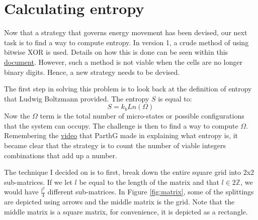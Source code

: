\section{Calculating entropy}
Now that a strategy that governs energy movement has been devised, our next task is to find a way to compute entropy. In version 1, a crude method of using bitwise XOR is used. Details on how this is done can be seen within this \href{https://github.com/ShiroHusin/Entropy_Simulation/blob/main/Entropy_Computation.pdf}{document}. However, such a method is not viable when the cells are no longer binary digits. Hence, a new strategy needs to be devised. \par

\vspace{0.3cm}
\noindent
The first step in solving this problem is to look back at the definition of entropy that Ludwig Boltzmann provided. The entropy $S$ is equal to: 
\begin{equation}
    S=k_{b}Ln(\Omega)
    \label{entropy_eq}
\end{equation}
Now the $\Omega$ term is the total number of micro-states or possible configurations that the system can occupy. The challenge is then to find a way to compute $\Omega$. Remembering the \href{https://www.youtube.com/watch?v=mg0hueOyoAw&ab_channel=ParthG}{video} that ParthG made in explaining what entropy is, it became clear that the strategy is to count the number of viable integers combinations that add up a number. \par

\vspace{0.3cm}
\noindent
The technique I decided on is to first, break down the entire square grid into 2x2 sub-matrices. If we let $l$ be equal to the length of the matrix and that $l \in 2\mathbb{Z}$, we would have $\frac{l^2}{4}$ different sub-matrices. In Figure \ref{fig:matrix}, some of the splittings are depicted using arrows and the middle matrix is the grid. Note that the middle matrix is a square matrix, for convenience, it is depicted as a rectangle.

